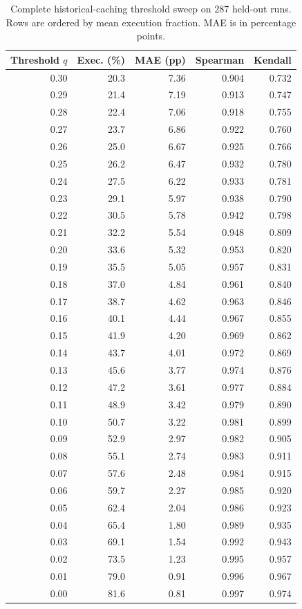 \begin{table}[t]
  \centering
  \scriptsize
  \setlength{\tabcolsep}{2.2pt}
  \begin{tabular}{rrrrr}
    \toprule
    Threshold $q$ & Exec. (\%) & MAE (pp) & Spearman & Kendall \\
    \midrule
    0.30 & 20.3 & 7.36 & 0.904 & 0.732 \\
    0.29 & 21.4 & 7.19 & 0.913 & 0.747 \\
    0.28 & 22.4 & 7.06 & 0.918 & 0.755 \\
    0.27 & 23.7 & 6.86 & 0.922 & 0.760 \\
    0.26 & 25.0 & 6.67 & 0.925 & 0.766 \\
    0.25 & 26.2 & 6.47 & 0.932 & 0.780 \\
    0.24 & 27.5 & 6.22 & 0.933 & 0.781 \\
    0.23 & 29.1 & 5.97 & 0.938 & 0.790 \\
    0.22 & 30.5 & 5.78 & 0.942 & 0.798 \\
    0.21 & 32.2 & 5.54 & 0.948 & 0.809 \\
    0.20 & 33.6 & 5.32 & 0.953 & 0.820 \\
    0.19 & 35.5 & 5.05 & 0.957 & 0.831 \\
    0.18 & 37.0 & 4.84 & 0.961 & 0.840 \\
    0.17 & 38.7 & 4.62 & 0.963 & 0.846 \\
    0.16 & 40.1 & 4.44 & 0.967 & 0.855 \\
    0.15 & 41.9 & 4.20 & 0.969 & 0.862 \\
    0.14 & 43.7 & 4.01 & 0.972 & 0.869 \\
    0.13 & 45.6 & 3.77 & 0.974 & 0.876 \\
    0.12 & 47.2 & 3.61 & 0.977 & 0.884 \\
    0.11 & 48.9 & 3.42 & 0.979 & 0.890 \\
    0.10 & 50.7 & 3.22 & 0.981 & 0.899 \\
    0.09 & 52.9 & 2.97 & 0.982 & 0.905 \\
    0.08 & 55.1 & 2.74 & 0.983 & 0.911 \\
    0.07 & 57.6 & 2.48 & 0.984 & 0.915 \\
    0.06 & 59.7 & 2.27 & 0.985 & 0.920 \\
    0.05 & 62.4 & 2.04 & 0.986 & 0.923 \\
    0.04 & 65.4 & 1.80 & 0.989 & 0.935 \\
    0.03 & 69.1 & 1.54 & 0.992 & 0.943 \\
    0.02 & 73.5 & 1.23 & 0.995 & 0.957 \\
    0.01 & 79.0 & 0.91 & 0.996 & 0.967 \\
    0.00 & 81.6 & 0.81 & 0.997 & 0.974 \\
    \bottomrule
  \end{tabular}
  \caption{Complete historical-caching threshold sweep on 287 held-out runs. Rows are ordered by mean execution fraction. MAE is in percentage points.}
  \label{tab:cache-complete}
\end{table}
